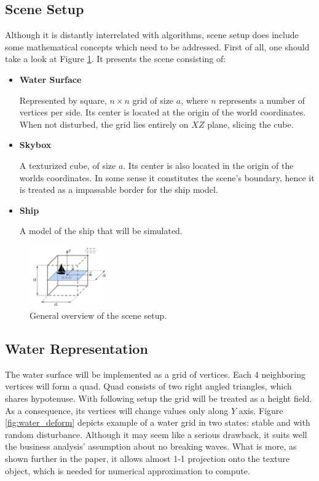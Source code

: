 \documentclass{report}
\begin{document}
\subsection{Scene Setup} \label{subsec:scene_setup}
Although it is distantly interrelated with algorithms, scene setup does include some mathematical concepts which need to be addressed. First of all, one should take a look at Figure \ref{fig:scene_setup}. It presents the scene consisting of:
\begin{itemize}
\item \textbf{Water Surface}

Represented by square, $n \times n$ grid of size $a$, where $n$ represents a number of vertices per side. Its center is located at the origin of the world coordinates. When not disturbed, the grid lies entirely on $XZ$ plane, slicing the cube. 

\item \textbf{Skybox}

A texturized cube, of size $a$. Its center is also located in the origin of the worlds coordinates. In some sense it constitutes the scene's boundary, hence it is treated as a impassable border for the ship model.

\item \textbf{Ship}

A model of the ship that will be simulated. 

\end{itemize}


\begin{figure}[H]
    \centering
    \includegraphics[width=0.3\textwidth]{images/scene_setup.pdf}
    \caption{General overview of the scene setup.}
    \label{fig:scene_setup}
\end{figure}

\subsection{Water Representation} \label{subsec:water_repr}
The water surface will be implemented as a grid of vertices. Each 4 neighboring vertices will form a quad. Quad consists of two right angled triangles, which shares hypotenuse. With following setup the grid will be treated as a height field. As a consequence, its vertices will change values only along $Y$ axis. Figure \ref{fig:water_deform} depicts example of a water grid in two states: stable and with random disturbance. Although it may seem like a serious drawback, it suits well the business analysis' assumption about no breaking waves. What is more, as shown further in the paper, it allows almost 1-1 projection onto the texture object, which is needed for numerical approximation to compute.
\end{document}

